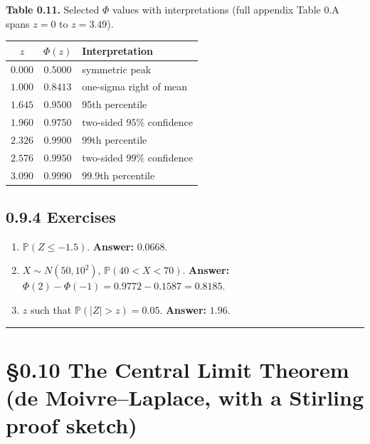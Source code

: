 \documentclass[
  10pt,
  twoside]{book}
\newcounter{none} %
\providecommand{\tightlist}{%
  \setlength{\itemsep}{0pt}\setlength{\parskip}{0pt}}
\begin{document}
\textbf{Table 0.11.} Selected \(\Phi\) values with interpretations (full
appendix Table 0.A spans \(z=0\) to \(z=3.49\)).

{\def\LTcaptype{none} %
\begin{table}[H]
\centering
\begin{tabular}{|c|c|l|}
\toprule
\(z\) & \(\Phi(z)\) & Interpretation \\
\midrule



\(0.000\) & \(0.5000\) & symmetric peak \\
\(1.000\) & \(0.8413\) & one-sigma right of mean \\
\(1.645\) & \(0.9500\) & 95th percentile \\
\(1.960\) & \(0.9750\) & two-sided \(95\%\) confidence \\
\(2.326\) & \(0.9900\) & 99th percentile \\
\(2.576\) & \(0.9950\) & two-sided \(99\%\) confidence \\
\(3.090\) & \(0.9990\) & 99.9th percentile \\
\bottomrule
\end{tabular}
\end{table}
}

\subsection{0.9.4 Exercises}\label{exercises-8}

\begin{enumerate}
\def\labelenumi{\arabic{enumi}.}
\tightlist
\item
  \(\mathbb{P}(Z \leq -1.5)\). \textbf{Answer:} \(0.0668\).
\item
  \(X \sim N(50, 10^2)\), \(\mathbb{P}(40 < X < 70)\). \textbf{Answer:}
  \(\Phi(2) - \Phi(-1) = 0.9772 - 0.1587 = 0.8185\).
\item
  \(z\) such that \(\mathbb{P}(|Z| > z) = 0.05\). \textbf{Answer:}
  \(1.96\).
\end{enumerate}

\begin{center}\rule{0.5\linewidth}{0.5pt}\end{center}

\section{§0.10 The Central Limit Theorem (de Moivre--Laplace, with a
Stirling proof
sketch)}\label{the-central-limit-theorem-de-moivrelaplace-with-a-stirling-proof-sketch}
\end{document}
